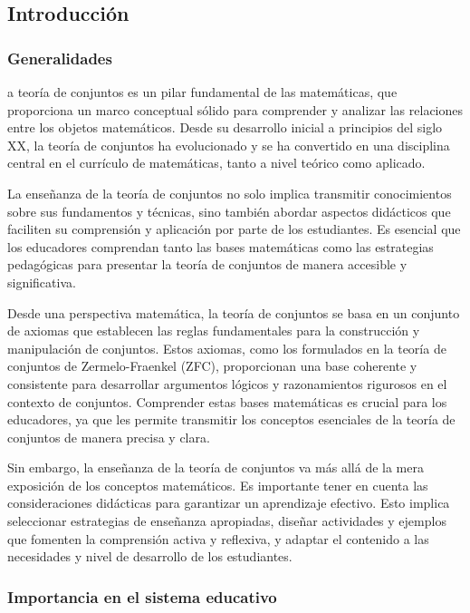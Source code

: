 \subsection{Introducción}

\subsubsection{Generalidades}

a teoría de conjuntos es un pilar fundamental de las matemáticas, que proporciona un marco conceptual sólido para comprender y analizar las relaciones entre los objetos matemáticos. Desde su desarrollo inicial a principios del siglo XX, la teoría de conjuntos ha evolucionado y se ha convertido en una disciplina central en el currículo de matemáticas, tanto a nivel teórico como aplicado.

La enseñanza de la teoría de conjuntos no solo implica transmitir conocimientos sobre sus fundamentos y técnicas, sino también abordar aspectos didácticos que faciliten su comprensión y aplicación por parte de los estudiantes. Es esencial que los educadores comprendan tanto las bases matemáticas como las estrategias pedagógicas para presentar la teoría de conjuntos de manera accesible y significativa.

Desde una perspectiva matemática, la teoría de conjuntos se basa en un conjunto de axiomas que establecen las reglas fundamentales para la construcción y manipulación de conjuntos. Estos axiomas, como los formulados en la teoría de conjuntos de Zermelo-Fraenkel (ZFC), proporcionan una base coherente y consistente para desarrollar argumentos lógicos y razonamientos rigurosos en el contexto de conjuntos. Comprender estas bases matemáticas es crucial para los educadores, ya que les permite transmitir los conceptos esenciales de la teoría de conjuntos de manera precisa y clara.

Sin embargo, la enseñanza de la teoría de conjuntos va más allá de la mera exposición de los conceptos matemáticos. Es importante tener en cuenta las consideraciones didácticas para garantizar un aprendizaje efectivo. Esto implica seleccionar estrategias de enseñanza apropiadas, diseñar actividades y ejemplos que fomenten la comprensión activa y reflexiva, y adaptar el contenido a las necesidades y nivel de desarrollo de los estudiantes.

\subsubsection{Importancia en el sistema educativo}

